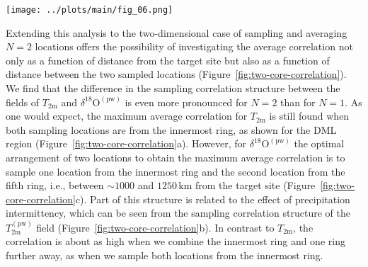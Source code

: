 \documentclass[draft]{agujournal2019}
\begin{document}
\begin{figure*}[t]%
\centering
\texttt{[image: ../plots/main/fig\_06.png]}
\caption{%
  Sampling correlation structure with temperature in the two-dimensional case
  of sampling two locations in the DML region. Shown is the mean correlation of
  all possible single correlations for the average of two grid cells of
  (a) $T_{\mathrm{2m}}$, (b) $T_{\mathrm{2m}}^{\mathrm{(pw)}}$ and (c)
  $\delta^{18}\mathrm{O}^{\mathrm{(pw)}}$ time series sampled from the same ring
  or from two different rings, averaged over all target sites in the given
  region. The axes display the distance from the target site, where the $x$
  ($y$) axis represents the first (second) sampled ring and the tick marks
  indicate the midpoint radii of the rings. Note the marked difference in the
  locations of the correlation maxima between $T_{\mathrm{2m}}$ and
  $\delta^{18}\mathrm{O}^{\mathrm{(pw)}}$.}
\label{fig:two-core-correlation}%
\end{figure*}%

Extending this analysis to the two-dimensional case of sampling and averaging
$N=2$ locations offers the possibility of investigating the average correlation
not only as a function of distance from the target site but also as a function
of distance between the two sampled locations
(Figure~\ref{fig:two-core-correlation}). We find that the difference in the
sampling correlation structure between the fields of $T_{\mathrm{2m}}$ and
$\delta^{18}\mathrm{O}^{\mathrm{(pw)}}$ is even more pronounced for $N=2$ than
for $N=1$. As one would expect, the maximum average correlation for
$T_{\mathrm{2m}}$ is still found when both sampling locations are from the
innermost ring, as shown for the DML region
(Figure~\ref{fig:two-core-correlation}a). However, for
$\delta^{18}\mathrm{O}^{\mathrm{(pw)}}$ the optimal arrangement of two locations
to obtain the maximum average correlation is to sample one location from the
innermost ring and the second location from the fifth ring, i.e., between
$\sim1000$ and $1250$\,km from the target site
(Figure~\ref{fig:two-core-correlation}c). Part of this structure is related to the
effect of precipitation intermittency, which can be seen from the sampling
correlation structure of the $T_{\mathrm{2m}}^{\mathrm{(pw)}}$ field
(Figure~\ref{fig:two-core-correlation}b). In contrast to $T_{\mathrm{2m}}$, the
correlation is about as high when we combine the innermost ring and one ring
further away, as when we sample both locations from the innermost ring.
\end{document}
